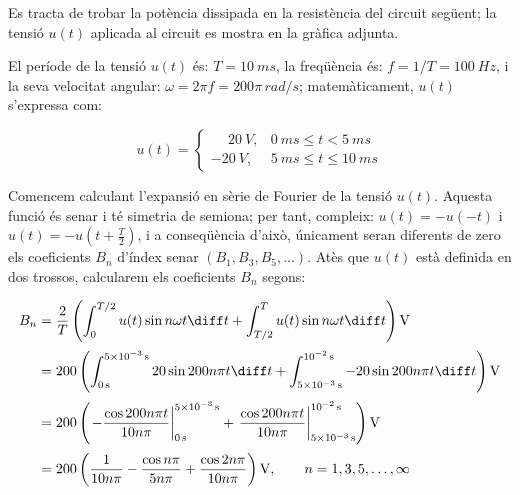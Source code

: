 \begin{exemple}\label{ex:CircuitFourier}
	\addcontentsxms{\CircuitFourier}
     Es tracta de trobar la potència
     dissipada en la resistència del circuit següent; la tensió $u(t)$ aplicada al circuit     es mostra en la gràfica adjunta.

    \begin{center}
        
    \end{center}

     El període de la tensió $u(t)$ és: $T=\qty{10}{ms}$, la freqüència és: $f=1/T=\qty{100}{Hz}$, i la
    seva velocitat angular: $\omega = 2\pi f = 200\pi\unit{\,rad/s}$;
    matemàticament, $u(t)$ s'expressa com:

    \[
    u(t) = \begin{cases} \phantom{-}\qty{20}{V}, & \qty{0}{ms} \leq t < \qty{5}{ms} \\
           \qty{-20}{V}, & \qty{5}{ms} \leq t \leq \qty{10}{ms} \end{cases}
    \]

    Comencem calculant l'expansió en sèrie de Fourier de la tensió
    $u(t)$. Aquesta funció és senar i té simetria de semiona; per tant,
     compleix: $u(t)=-u(-t)$ i $u(t) = -u(t+\frac{T}{2})$, i a conseqüència   d'això, únicament seran diferents de zero els coeficients $B_n$ d'índex senar $(B_1,B_3,B_5,\ldots)$. Atès que
    $u(t)$ està definida en dos trossos, calcularem els coeficients
    $B_n$ segons:

    \[
    \begin{split}
        B_n &= \frac{2}{T} \left( \int_0^{T/2} u(t) \sin n \omega t \diff t+
        \int_{T/2}^{T} u(t) \sin n \omega t \diff t\right) \unit{V} \\[0.5ex]
        &= 200 \left( \int_{\qty{0}{s}}^{\qty{5e-3}{s}} 20 \sin 200 n \pi t \diff t+
        \int_{\qty{5e-3}{s}}^{\qty{e-2}{s}} -20 \sin 200 n \pi t \diff t \right) \unit{V}\\[0.5ex]
        &= 200 \left( \left. -\frac{\cos 200 n \pi t}{10 n \pi}\right|_{\qty{0}{s}}^{\qty{5e-3}{s}}
        +  \left.\frac{\cos 200 n \pi t}{10 n \pi}\right|_{\qty{5e-3}{s}}^{\qty{e-2}{s}}\right) \unit{V}\\[0.5ex]
        &= 200\left( \frac{1}{10 n \pi} - \frac{\cos n \pi}{5 n \pi} +
        \frac{\cos 2 n \pi}{10 n \pi}\right) \unit{V},
        \qquad n=1,3,5,\ldots,\infty
    \end{split}
    \]


\end{exemple}

